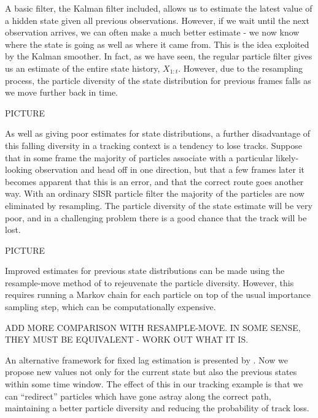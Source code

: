 A basic filter, the Kalman filter included, allows us to estimate the latest value of a hidden state given all previous observations. However, if we wait until the next observation arrives, we can often make a much better estimate - we now know where the state is going as well as where it came from. This is the idea exploited by the Kalman smoother. In fact, as we have seen, the regular particle filter gives us an estimate of the entire state history, $X_{1:t}$. However, due to the resampling process, the particle diversity of the state distribution for previous frames falls as we move further back in time.

PICTURE

As well as giving poor estimates for state distributions, a further disadvantage of this falling diversity in a tracking context is a tendency to lose tracks. Suppose that in some frame the majority of particles associate with a particular likely-looking observation and head off in one direction, but that a few frames later it becomes apparent that this is an error, and that the correct route goes another way. With an ordinary SISR particle filter the majority of the particles are now eliminated by resampling. The particle diversity of the state estimate will be very poor, and in a challenging problem there is a good chance that the track will be lost.

PICTURE

Improved estimates for previous state distributions can be made using the resample-move method of \cite{Gilks2001} to rejeuvenate the particle diversity. However, this requires running a Markov chain for each particle on top of the usual importance sampling step, which can be computationally expensive.

ADD MORE COMPARISON WITH RESAMPLE-MOVE. IN SOME SENSE, THEY MUST BE EQUIVALENT - WORK OUT WHAT IT IS.

An alternative framework for fixed lag estimation is presented by \cite{Doucet2006}. Now we propose new values not only for the current state but also the previous states within some time window. The effect of this in our tracking example is that we can ``redirect'' particles which have gone astray along the correct path, maintaining a better particle diversity and reducing the probability of track loss.

